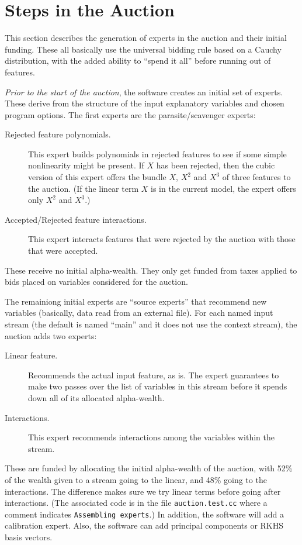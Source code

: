 \documentclass[12pt]{article}
\begin{document}
\clearpage
\section{Steps in the Auction} %

 This section describes the generation of experts in the auction and their
 initial funding. These all basically use the universal bidding rule based on a
 Cauchy distribution, with the added ability to ``spend it all'' before running
 out of features.

 {\em Prior to the start of the auction}, the software creates an initial set of
 experts.  These derive from the structure of the input explanatory variables
 and chosen program options.  The first experts are the parasite/scavenger
 experts:
 \begin{description}
  \item[Rejected feature polynomials.] This expert builds polynomials in
 rejected features to see if some simple nonlinearity might be present.  If $X$
 has been rejected, then the cubic version of this expert offers the bundle $X$,
 $X^2$ and $X^3$ of three features to the auction.  (If the linear term $X$ is
 in the current model, the expert offers only $X^2$ and $X^3$.)
  \item[Accepted/Rejected feature interactions.] This expert interacts features
 that were rejected by the auction with those that were accepted.

 \end{description}
 These receive no initial alpha-wealth.  They only get funded from taxes applied
 to bids placed on variables considered for the auction.

 The remainiong initial experts are ``source experts'' that recommend new
 variables (basically, data read from an external file).  For each named input
 stream (the default is named ``main'' and it does not use the context stream),
 the auction adds two experts:
 \begin{description}
  \item[Linear feature.] Recommends the actual input feature, as is.  The expert
 guarantees to make two passes over the list of variables in this stream before
 it spends down all of its allocated alpha-wealth.
  \item[Interactions.]  This expert recommends interactions among the variables
 within the stream. 
 \end{description}
 These are funded by allocating the initial alpha-wealth of the auction, with
 52\% of the wealth given to a stream going to the linear, and 48\% going to the
 interactions.  The difference makes sure we try linear terms before going after
 interactions.  (The associated code is in the file {\tt auction.test.cc} where
 a comment indicates {\tt Assembling experts}.)  In addition, the software will
 add a calibration expert.  Also, the software can add principal components or
 RKHS basis vectors.
\end{document}
